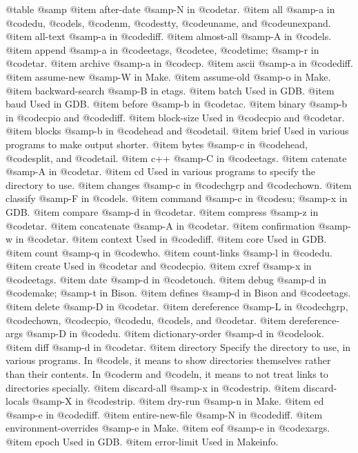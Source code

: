 @table @samp
@item after-date
@samp{-N} in @code{tar}.
@item all
@samp{-a} in @code{du}, @code{ls}, @code{nm}, @code{stty}, @code{uname},
and @code{unexpand}.
@item all-text
@samp{-a} in @code{diff}.
@item almost-all
@samp{-A} in @code{ls}.
@item append
@samp{-a} in @code{etags}, @code{tee}, @code{time}; @samp{-r} in
@code{tar}.
@item archive
@samp{-a} in @code{cp}.
@item ascii
@samp{-a} in @code{diff}.
@item assume-new
@samp{-W} in Make.
@item assume-old
@samp{-o} in Make.
@item backward-search
@samp{-B} in etags.
@item batch
Used in GDB.
@item baud
Used in GDB.
@item before
@samp{-b} in @code{tac}.
@item binary
@samp{-b} in @code{cpio} and @code{diff}.
@item block-size
Used in @code{cpio} and @code{tar}.
@item blocks
@samp{-b} in @code{head} and @code{tail}.
@item brief
Used in various programs to make output shorter.
@item bytes
@samp{-c} in @code{head}, @code{split}, and @code{tail}.
@item c++
@samp{-C} in @code{etags}.
@item catenate
@samp{-A} in @code{tar}.
@item cd
Used in various programs to specify the directory to use.
@item changes
@samp{-c} in @code{chgrp} and @code{chown}.
@item classify
@samp{-F} in @code{ls}.
@item command
@samp{-c} in @code{su}; @samp{-x} in GDB.
@item compare
@samp{-d} in @code{tar}.
@item compress
@samp{-z} in @code{tar}.
@item concatenate
@samp{-A} in @code{tar}.
@item confirmation
@samp{-w} in @code{tar}.
@item context
Used in @code{diff}.
@item core
Used in GDB.
@item count
@samp{-q} in @code{who}.
@item count-links
@samp{-l} in @code{du}.
@item create
Used in @code{tar} and @code{cpio}.
@item cxref
@samp{-x} in @code{etags}.
@item date
@samp{-d} in @code{touch}.
@item debug
@samp{-d} in @code{make}; @samp{-t} in Bison.
@item defines
@samp{-d} in Bison and @code{etags}.
@item delete
@samp{-D} in @code{tar}.
@item dereference
@samp{-L} in @code{chgrp}, @code{chown}, @code{cpio}, @code{du},
@code{ls}, and @code{tar}.
@item dereference-args
@samp{-D} in @code{du}.
@item dictionary-order
@samp{-d} in @code{look}.
@item diff
@samp{-d} in @code{tar}.
@item directory
Specify the directory to use, in various programs.  In @code{ls}, it
means to show directories themselves rather than their contents.  In
@code{rm} and @code{ln}, it means to not treat links to directories
specially.
@item discard-all
@samp{-x} in @code{strip}.
@item discard-locals
@samp{-X} in @code{strip}.
@item dry-run
@samp{-n} in Make.
@item ed
@samp{-e} in @code{diff}.
@item entire-new-file
@samp{-N} in @code{diff}.
@item environment-overrides
@samp{-e} in Make.
@item eof
@samp{-e} in @code{xargs}.
@item epoch
Used in GDB.
@item error-limit
Used in Makeinfo.
